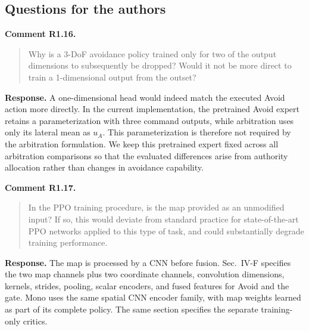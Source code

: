 \documentclass[letterpaper,11pt]{article}
\begin{document}
\subsection*{Questions for the authors}
\noindent\textbf{Comment R1.16.}
\begin{quote}\color{reviewgray}
Why is a 3-DoF avoidance policy trained only for two of the output dimensions to subsequently be dropped? Would it not be more direct to train a 1-dimensional output from the outset?
\end{quote}
\noindent\textbf{Response.}
A one-dimensional head would indeed match the executed Avoid action more directly. In the current implementation, the pretrained Avoid expert retains a parameterization with three command outputs, while arbitration uses only its lateral mean as $u_A$. This parameterization is therefore not required by the arbitration formulation. We keep this pretrained expert fixed across all arbitration comparisons so that the evaluated differences arise from authority allocation rather than changes in avoidance capability.
\par\nopagebreak[4]


\noindent\textbf{Comment R1.17.}
\begin{quote}\color{reviewgray}
In the PPO training procedure, is the map provided as an unmodified input? If so, this would deviate from standard practice for state-of-the-art PPO networks applied to this type of task, and could substantially degrade training performance.
\end{quote}
\noindent\textbf{Response.}
The map is processed by a CNN before fusion. Sec.~IV-F specifies the two map channels plus two coordinate channels, convolution dimensions, kernels, strides, pooling, scalar encoders, and fused features for Avoid and the gate. Mono uses the same spatial CNN encoder family, with map weights learned as part of its complete policy. The same section specifies the separate training-only critics.
\par\nopagebreak[4]


\end{document}
